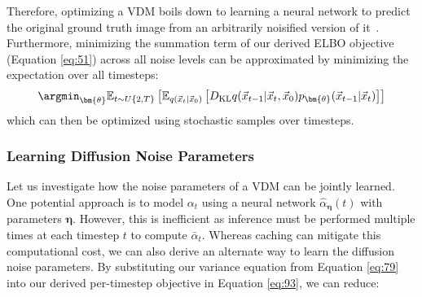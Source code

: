 \endgroup
Therefore, optimizing a VDM boils down to learning a neural network to predict the original ground truth image from an arbitrarily noisified version of it~\cite{ho2020denoising}.  Furthermore, minimizing the summation term of our derived ELBO objective (Equation \ref{eq:51}) across all noise levels can be approximated by minimizing the expectation over all timesteps:
\begin{align}
\argmin_{\bm{\theta}}\mathbb{E}_{t\sim U\{2, T\}}\left[\mathbb{E}_{q(\vec{x}_{t}|\vec{x}_0)}\left[D_{\rm{KL}}{q(\vec{x}_{t-1}|\vec{x}_t, \vec{x}_0)}{p_{\bm{\theta}}(\vec{x}_{t-1}|\vec{x}_t)}\right]\right] \label{eq:94}
\end{align}
which can then be optimized using stochastic samples over timesteps.

\subsubsection*{Learning Diffusion Noise Parameters}
%
Let us investigate how the noise parameters of a VDM can be jointly learned.  One potential approach is to model $\alpha_t$ using a neural network $\hat\alpha_{\bm{\eta}}(t)$ with parameters $\bm{\eta}$.  However, this is inefficient as inference must be performed multiple times at each timestep $t$ to compute $\bar\alpha_t$.  Whereas caching can mitigate this computational cost, we can also derive an alternate way to learn the diffusion noise parameters. By substituting our variance equation from Equation \ref{eq:79} into our derived per-timestep objective in Equation \ref{eq:93}, we can reduce:
